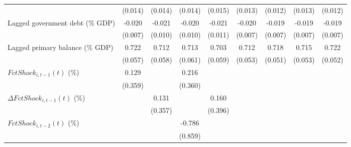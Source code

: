 {\begin{tabular}{l*{8}{c}}
                    &     (0.014)         &     (0.014)         &     (0.014)         &     (0.015)         &     (0.013)         &     (0.012)         &     (0.013)         &     (0.012)         \\
\addlinespace
Lagged government debt (\% GDP)&      -0.020\sym{***}&      -0.021\sym{**} &      -0.020\sym{**} &      -0.021\sym{*}  &      -0.020\sym{**} &      -0.019\sym{**} &      -0.019\sym{**} &      -0.019\sym{**} \\
                    &     (0.007)         &     (0.010)         &     (0.010)         &     (0.011)         &     (0.007)         &     (0.007)         &     (0.007)         &     (0.007)         \\
\addlinespace
Lagged primary balance (\% GDP)&       0.722\sym{***}&       0.712\sym{***}&       0.713\sym{***}&       0.703\sym{***}&       0.712\sym{***}&       0.718\sym{***}&       0.715\sym{***}&       0.722\sym{***}\\
                    &     (0.057)         &     (0.058)         &     (0.061)         &     (0.059)         &     (0.053)         &     (0.051)         &     (0.053)         &     (0.052)         \\
\addlinespace
$ FctShock_{i,t-1}(t)$ (\%)&       0.129         &                     &       0.216         &                     &                     &                     &                     &                     \\
                    &     (0.359)         &                     &     (0.360)         &                     &                     &                     &                     &                     \\
\addlinespace
$ \Delta FctShock_{i,t-1}(t)$ (\%)&                     &       0.131         &                     &       0.160         &                     &                     &                     &                     \\
                    &                     &     (0.357)         &                     &     (0.396)         &                     &                     &                     &                     \\
\addlinespace
$ FctShock_{i,t-2}(t)$ (\%)&                     &                     &      -0.786         &                     &                     &                     &                     &                     \\
                    &                     &                     &     (0.859)         &                     &                     &                     &                     &                     \\

\end{tabular}}
